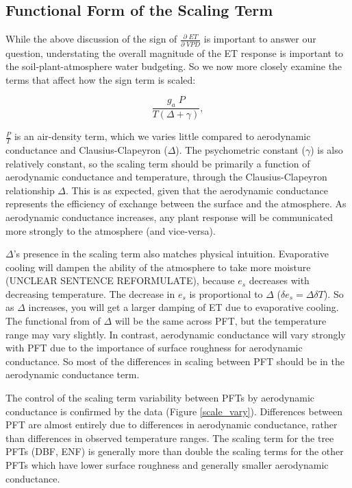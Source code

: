 \documentclass[draft,linenumbers]{agujournal}
\begin{document}
\subsection{Functional Form of the Scaling Term}
\label{scale_term}
While the above discussion of the sign of $\frac{\partial \; ET}{\partial \; VPD}$ is important to answer our question, understating the overall magnitude of the ET response is important to the soil-plant-atmosphere water budgeting. So we now more closely examine the terms that affect how the sign term is scaled:

\begin{equation}
  \frac{g_a \; P}{T(\Delta + \gamma)},
\end{equation}

$\frac{P}{T}$ is an air-density term, which we varies little compared to aerodynamic conductance and Clausius-Clapeyron ($\Delta$). The psychometric constant ($\gamma$) is also relatively constant, so the scaling term should be primarily a function of aerodynamic conductance and temperature, through the Clausius-Clapeyron relationship $\Delta$. This is as expected, given that the aerodynamic conductance represents the efficiency of exchange between the surface and the atmosphere. As aerodynamic conductance  increases, any plant response will be communicated more strongly to the atmosphere (and vice-versa).

$\Delta$'s presence in the scaling term also matches physical intuition. Evaporative cooling will dampen the ability of the atmosphere to take more moisture (UNCLEAR SENTENCE REFORMULATE), because $e_{s}$ decreases with decreasing temperature. The decrease in $e_{s}$ is proportional to $\Delta$ ($\delta e_{s} = \Delta \delta T$). So as $\Delta$ increases, you will get a larger damping of ET due to evaporative cooling. The functional from of $\Delta$ will be the same across PFT, but the temperature range may vary slightly. In contrast, aerodynamic conductance will vary strongly with PFT due to the importance of surface roughness for aerodynamic conductance. So most of the differences in scaling between PFT should be in the aerodynamic conductance term. 

The control of the scaling term variability between PFTs by aerodynamic conductance is confirmed by the data (Figure \ref{scale_vary}). Differences between PFT are almost entirely due to differences in aerodynamic conductance, rather than differences in observed temperature ranges. The scaling term for the tree PFTs (DBF, ENF) is generally more than double the scaling terms for the other PFTs which have lower surface roughness and generally smaller aerodynamic conductance.
\end{document}
